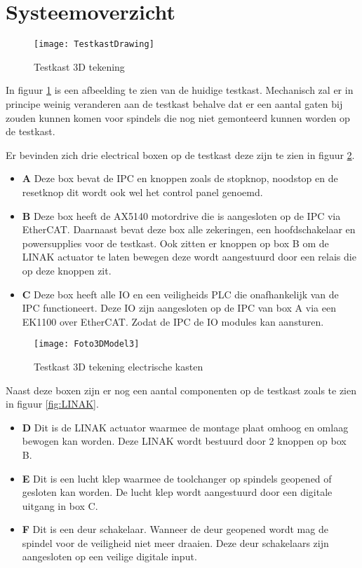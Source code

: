 \section{Systeemoverzicht}

\begin{figure}[H]
	\centering
	\texttt{[image: TestkastDrawing]}
	\label{fig:TestkastDrawing}
	\caption{Testkast 3D tekening}
\end{figure}

In figuur \ref{fig:TestkastDrawing} is een afbeelding te zien van de huidige testkast. Mechanisch zal er in principe weinig veranderen aan de testkast behalve dat er een aantal gaten bij zouden kunnen komen voor spindels die nog niet gemonteerd kunnen worden op de testkast.

\vspace{0.5cm}

Er bevinden zich drie electrical boxen op de testkast deze zijn te zien in figuur \ref{fig:Foto3DModel3}.

\begin{itemize}
	\item \textbf{A} Deze box bevat de \gls{IPC} en knoppen zoals de stopknop, noodstop en de resetknop dit wordt ook wel het control panel genoemd.
	\item \textbf{B} Deze box heeft de \gls{AX5140} motordrive die is aangesloten op de \gls{IPC} via \gls{EtherCAT}. Daarnaast bevat deze box alle zekeringen, een hoofdschakelaar en powersupplies voor de testkast. Ook zitten er knoppen op box B om de LINAK actuator te laten bewegen deze wordt aangestuurd door een relais die op deze knoppen zit.
	\item \textbf{C} Deze box heeft alle \gls{IO} en een veiligheids \gls{PLC} die onafhankelijk van de \gls{IPC} functioneert. Deze \gls{IO} zijn aangesloten op de \gls{IPC} van box A via een EK1100 over \gls{EtherCAT}. Zodat de \gls{IPC} de \gls{IO} modules kan aansturen. 
\end{itemize}

\begin{figure}[H]
	\centering
	\texttt{[image: Foto3DModel3]}
	\label{fig:Foto3DModel3}
	\caption{Testkast 3D tekening electrische kasten}
\end{figure}

Naast deze boxen zijn er nog een aantal componenten op de testkast zoals te zien in figuur \ref{fig:LINAK}.

\begin{itemize}
	\item \textbf{D} Dit is de LINAK actuator waarmee de montage plaat omhoog en omlaag bewogen kan worden. Deze LINAK wordt bestuurd door 2 knoppen op box B.
	\item \textbf{E} Dit is een lucht klep waarmee de toolchanger op spindels geopened of gesloten kan worden. De lucht klep wordt aangestuurd door een digitale uitgang in box C.
	\item \textbf{F} Dit is een deur schakelaar. Wanneer de deur geopened wordt mag de spindel voor de veiligheid niet meer draaien. Deze deur schakelaars zijn aangesloten op een veilige digitale input.
\end{itemize}

